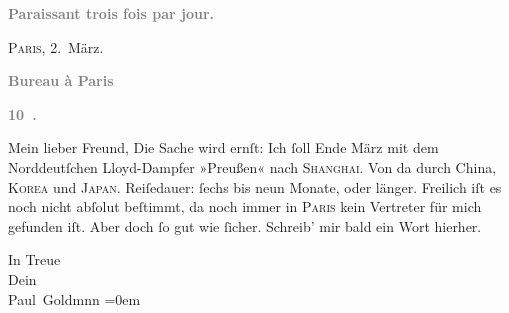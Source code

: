 \pstart
           \begin{otherlanguage}{french}\textcolor{gray}{\textbf{\textbf{Paraissant trois fois par jour.}}}\end{otherlanguage}\hfill \textsc{Paris}, 2. März.\pend
           
\pstart
           \begin{otherlanguage}{french}\textcolor{gray}{\textbf{\textbf{Bureau à Paris}}}\end{otherlanguage}\pend
           
\pstart
           \begin{otherlanguage}{french}\textcolor{gray}{\textbf{\textbf{10 .}}}\end{otherlanguage}\pend
           
\pstart\center{}Mein lieber Freund,\pend\vspace{0.5em}
\pstart
           Die Sache wird ernſt: Ich{ }ſoll Ende März mit dem Norddeutſchen Lloyd-Dampfer »Preußen« nach \textsc{Shanghai}. Von da durch China, \textsc{Korea} und \textsc{Japan}. Reiſedauer:{ }ſechs bis neun Monate, oder länger. Freilich iſt es noch nicht
               abſolut beſtimmt, da noch immer in \textsc{Paris} kein Vertreter für mich gefunden iſt. Aber doch{ }ſo gut wie{ }ſicher. Schreib’ mir
               bald ein Wort hierher.\pend
           
\pstart
           In Treue {\\[\baselineskip]}Dein {\\[\baselineskip]}\spacefill\mbox{Paul Goldmnn}\pend
           \leftskip=0em{}\endnumbering{}  \newcommand{\dateiname}{L02840}\newcommand{\titel}{Paul Goldmann an Arthur Schnitzler, 2. 3. [1898]}\newcommand{\editorInnen}{Martin Anton Müller und Laura Untner}
